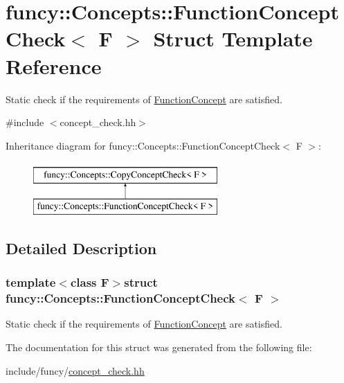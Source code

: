 \hypertarget{structfuncy_1_1Concepts_1_1FunctionConceptCheck}{\section{funcy\-:\-:Concepts\-:\-:Function\-Concept\-Check$<$ F $>$ Struct Template Reference}
\label{structfuncy_1_1Concepts_1_1FunctionConceptCheck}
}


Static check if the requirements of \hyperlink{structfuncy_1_1Concepts_1_1FunctionConcept}{Function\-Concept} are satisfied.  




{\ttfamily \#include $<$concept\-\_\-check.\-hh$>$}

Inheritance diagram for funcy\-:\-:Concepts\-:\-:Function\-Concept\-Check$<$ F $>$\-:\begin{figure}[H]
\begin{center}
\leavevmode
\includegraphics[height=2.000000cm]{structfuncy_1_1Concepts_1_1FunctionConceptCheck}
\end{center}
\end{figure}


\subsection{Detailed Description}
\subsubsection*{template$<$class F$>$struct funcy\-::\-Concepts\-::\-Function\-Concept\-Check$<$ F $>$}

Static check if the requirements of \hyperlink{structfuncy_1_1Concepts_1_1FunctionConcept}{Function\-Concept} are satisfied. 

The documentation for this struct was generated from the following file\-:\begin{DoxyCompactItemize}
\item 
include/funcy/\hyperlink{concept__check_8hh}{concept\-\_\-check.\-hh}\end{DoxyCompactItemize}
